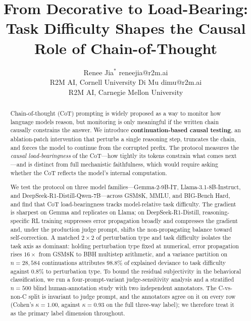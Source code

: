 \documentclass[10pt]{article} %
\title{From Decorative to Load-Bearing: Task Difficulty Shapes the Causal Role of Chain-of-Thought}
\author{\name Renee Jia$^{*}$ \email reneejia@r2m.ai \\
      \addr R2M AI, Cornell University
      \AND
      \name Di Mu \email dimu@r2m.ai \\
      \addr R2M AI, Carnegie Mellon University}
\begin{document}
\maketitle

\begingroup
\renewcommand\thefootnote{$*$}%
\addtocounter{footnote}{-1}%
\endgroup
\setcounter{footnote}{0}

\begin{abstract}
Chain-of-thought (CoT) prompting is widely proposed as a way to monitor how language models reason, but monitoring is only meaningful if the written chain causally constrains the answer. We introduce \textbf{continuation-based causal testing}, an ablation-patch intervention that perturbs a single reasoning step, truncates the chain, and forces the model to continue from the corrupted prefix. The protocol measures the \emph{causal load-bearingness} of the CoT---how tightly its tokens constrain what comes next---and is distinct from full mechanistic faithfulness, which would require asking whether the CoT reflects the model's internal computation.

We test the protocol on three model families---Gemma-2-9B-IT, Llama-3.1-8B-Instruct, and DeepSeek-R1-Distill-Qwen-7B---across GSM8K, MMLU, and BIG-Bench Hard, and find that CoT load-bearingness tracks model-relative task difficulty. The gradient is sharpest on Gemma and replicates on Llama; on DeepSeek-R1-Distill, reasoning-specific RL training suppresses error propagation broadly and compresses the gradient and, under the production judge prompt, shifts the non-propagating balance toward self-correction. A matched $2{\times}2$ of perturbation type and task difficulty isolates the task axis as dominant: holding perturbation type fixed at numerical, error propagation rises $16\times$ from GSM8K to BBH multistep arithmetic, and a variance partition on $n = 28{,}584$ continuations attributes $98.8\%$ of explained deviance to task difficulty against $0.8\%$ to perturbation type. To bound the residual subjectivity in the behavioral classification, we run a four-prompt-variant judge-sensitivity analysis and a stratified $n = 500$ blind human-annotation study with two independent annotators. The C-vs-non-C split is invariant to judge prompt, and the annotators agree on it on every row (Cohen's $\kappa = 1.00$, against $\kappa = 0.93$ on the full three-way label); we therefore treat it as the primary label dimension throughout.


\end{abstract}
\end{document}
